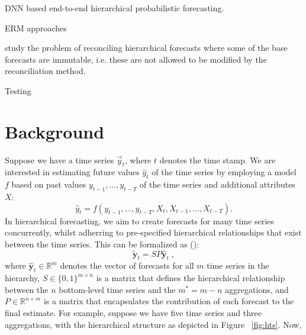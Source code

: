 \documentclass{article}
\begin{document}
  \cite{rangapuram_endtoend_2021} DNN based end-to-end hierarchical probabilistic forecasting.

  \cite{bentaieb_regularized_2019} ERM approaches

  \cite{taieb_sparse_2017}

  \cite{zhang_optimal_2022} study the problem of reconciling hierarchical forecasts where some of the base forecasts are immutable, i.e. these are not allowed to be modified by the reconciliation method. 

  Testing
  

\section{Background}
  \label{sec:background}
  Suppose we have a time series \(\vec{y}_t\), where \(t\) denotes the time stamp. We are interested in estimating future values \(\hat{y}_{t}\) of the time series by employing a model \(f\) based on past values \(y_{t-1}, \dots, y_{t-T}\) of the time series and additional attributes \(X\):
  \begin{equation}
    \hat{y}_{t} = f(y_{t-1}, \dots, y_{t-T}, X_{t}, X_{t-1}, \dots, X_{t-T}).
  \end{equation}
  In hierarchical forecasting, we aim to create forecasts for many time series concurrently, whilst adherring to pre-specified hierarchical relationships that exist between the time series. This can be formalized as (\cite{hyndman_forecasting_2021}):
  \begin{equation} \label{eq:hfp}
    \tilde{\textbf{y}}_{t} = SP\hat{\textbf{y}}_{t} \;,
  \end{equation}
  where \(\hat{\textbf{y}}_{t} \in \mathbb{R}^{m} \) denotes the vector of forecasts for all \(m\) time series in the hierarchy, \(S \in \{0, 1\}^{m \times n}\) is a matrix that defines the hierarchical relationship between the \(n\) bottom-level time series and the \(m^* = m - n\) aggregations, and \(P \in \mathbb{R}^{n \times m}\) is a matrix that encapsulates the contribution of each forecast to the final estimate. For example, suppose we have five time series and three aggregations, with the hierarchical structure as depicted in Figure~
  \ref{fig:hts}. Now,
\end{document}
